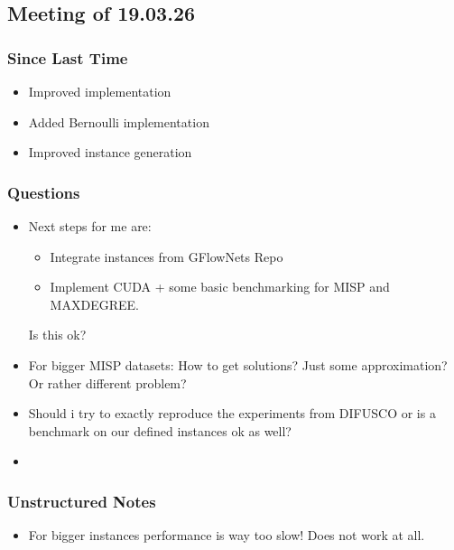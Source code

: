 
\subsection{Meeting of 19.03.26}
\subsubsection{Since Last Time}
\begin{itemize}
    \item Improved implementation
    \item Added Bernoulli implementation
    \item Improved instance generation
\end{itemize}
\subsubsection{Questions}
\begin{itemize}
    \item Next steps for me are:
    \begin{itemize}
        \item Integrate instances from GFlowNets Repo
        \item Implement CUDA + some basic benchmarking for MISP and MAXDEGREE.
    \end{itemize} Is this ok?
    \item For bigger MISP datasets: How to get solutions? Just some approximation? Or rather different problem?
    \item Should i try to exactly reproduce the experiments from DIFUSCO or is a benchmark on our defined instances ok as well?
    \item {}
\end{itemize}
\subsubsection{Unstructured Notes}
\begin{itemize}
    \item For bigger instances performance is way too slow! Does not work at all.
\end{itemize}